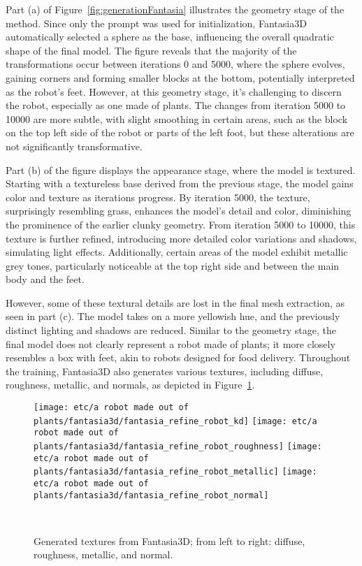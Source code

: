 Part (a) of Figure~\ref{fig:generationFantasia} illustrates the geometry stage of the method. Since only the prompt was used for initialization, Fantasia3D automatically selected a sphere as the base, influencing the overall quadratic shape of the final model. The figure reveals that the majority of the transformations occur between iterations 0 and 5000, where the sphere evolves, gaining corners and forming smaller blocks at the bottom, potentially interpreted as the robot's feet. However, at this geometry stage, it's challenging to discern the robot, especially as one made of plants. The changes from iteration 5000 to 10000 are more subtle, with slight smoothing in certain areas, such as the block on the top left side of the robot or parts of the left foot, but these alterations are not significantly transformative.

Part (b) of the figure displays the appearance stage, where the model is textured. Starting with a textureless base derived from the previous stage, the model gains color and texture as iterations progress. By iteration 5000, the texture, surprisingly resembling grass, enhances the model's detail and color, diminishing the prominence of the earlier clunky geometry. From iteration 5000 to 10000, this texture is further refined, introducing more detailed color variations and shadows, simulating light effects. Additionally, certain areas of the model exhibit metallic grey tones, particularly noticeable at the top right side and between the main body and the feet. 

However, some of these textural details are lost in the final mesh extraction, as seen in part (c). The model takes on a more yellowish hue, and the previously distinct lighting and shadows are reduced. Similar to the geometry stage, the final model does not clearly represent a robot made of plants; it more closely resembles a box with feet, akin to robots designed for food delivery. Throughout the training, Fantasia3D also generates various textures, including diffuse, roughness, metallic, and normals, as depicted in Figure~\ref{fig:texturesFantasia}.

\begin{figure}[H]
    \centering
      \texttt{[image: etc/a robot made out of plants/fantasia3d/fantasia\_refine\_robot\_kd]}
      \texttt{[image: etc/a robot made out of plants/fantasia3d/fantasia\_refine\_robot\_roughness]}
      \texttt{[image: etc/a robot made out of plants/fantasia3d/fantasia\_refine\_robot\_metallic]}
      \texttt{[image: etc/a robot made out of plants/fantasia3d/fantasia\_refine\_robot\_normal]}
      \caption{Generated textures from Fantasia3D\@; from left to right:  diffuse, roughness, metallic, and normal.}~\label{fig:texturesFantasia}
  \end{figure}